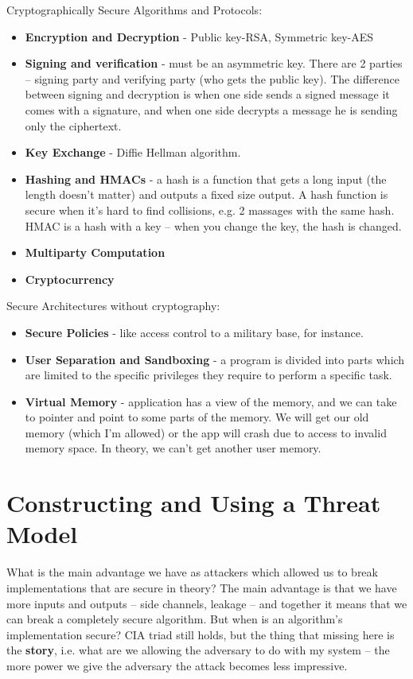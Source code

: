 Cryptographically Secure Algorithms and Protocols:
\begin{itemize}
    \item \textbf{Encryption and Decryption} - Public key-RSA, Symmetric key-AES
    \item \textbf{Signing and verification} - must be an asymmetric key. There
    are 2 parties – signing party and verifying party (who gets the public key).
    The difference between signing and decryption is when one side sends a
    signed message it comes with a signature, and when one side decrypts a
    message he is sending only the ciphertext.
    \item \textbf{Key Exchange} - Diffie Hellman algorithm.
    \item \textbf{Hashing and HMACs} - a hash is a function that gets a long
    input (the length doesn't matter) and outputs a fixed size output. A hash
    function is secure when it's hard to find collisions, e.g. 2 massages with
    the same hash. HMAC is a hash with a key – when you change the key, the hash
    is changed.
    \item \textbf{Multiparty Computation}
    \item \textbf{Cryptocurrency}
\end{itemize}

Secure Architectures without cryptography:
\begin{itemize}
    \item \textbf{Secure Policies} - like access control to a military base, for
    instance.
    \item \textbf{User Separation and Sandboxing} - a program is divided into
    parts which are limited to the specific privileges they require to perform a
    specific task.
    \item \textbf{Virtual Memory} - application has a view of the memory, and we
    can take to pointer and point to some parts of the memory. We will get our
    old memory (which I'm allowed) or the app will crash due to access to
    invalid memory space. In theory, we can't get another user memory.
\end{itemize}

\section{Constructing and Using a Threat Model} \label{sec:BreakImpl}

What is the main advantage we have as attackers which allowed us to break
implementations that are secure in theory? The main advantage is that we have
more inputs and outputs – side channels, leakage – and together it means that we
can break a completely secure algorithm. But when is an algorithm's
implementation secure? CIA triad still holds, but the thing that missing here is
the \textbf{story}, i.e. what are we allowing the adversary to do with my system
– the more power we give the adversary the attack becomes less impressive. 

